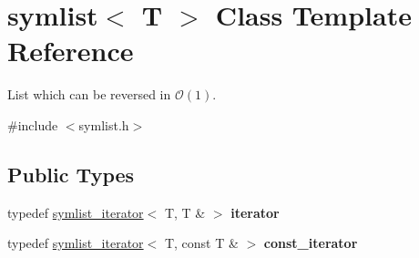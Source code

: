 \hypertarget{classsymlist}{}\section{symlist$<$ T $>$ Class Template Reference}
\label{classsymlist}


List which can be reversed in $\mathcal{O}(1)$.  




{\ttfamily \#include $<$symlist.\+h$>$}

\subsection*{Public Types}
\begin{DoxyCompactItemize}
\item 
\mbox{\label{classsymlist_a66045fbe3d98975e5537092ede8b50df}} 
typedef \mbox{\hyperlink{structsymlist__iterator}{symlist\+\_\+iterator}}$<$ T, T \& $>$ {\bfseries iterator}
\item 
\mbox{\label{classsymlist_af15c0ca931299054f83d17a1580a5159}} 
typedef \mbox{\hyperlink{structsymlist__iterator}{symlist\+\_\+iterator}}$<$ T, const T \& $>$ {\bfseries const\+\_\+iterator}
\end{DoxyCompactItemize}
